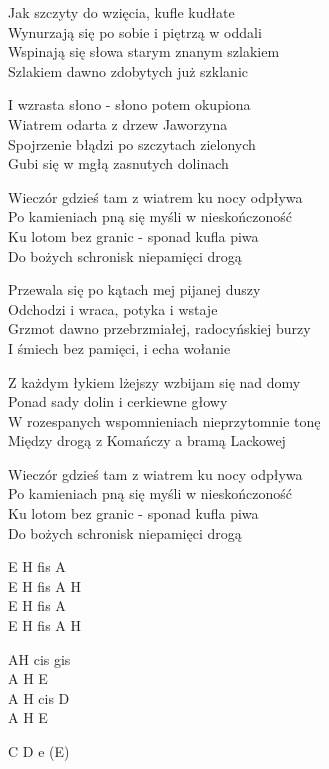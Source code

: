 \begin{text}
Jak szczyty do wzięcia, kufle kudłate\\
Wynurzają się po sobie i piętrzą w oddali\\
Wspinają się słowa starym znanym szlakiem\\
Szlakiem dawno zdobytych już szklanic

I wzrasta słono - słono potem okupiona\\
Wiatrem odarta z drzew Jaworzyna\\
Spojrzenie błądzi po szczytach zielonych\\
Gubi się w mgłą zasnutych dolinach

\vin Wieczór gdzieś tam z wiatrem ku nocy odpływa\\
\vin Po kamieniach pną się myśli w nieskończoność\\
\vin Ku lotom bez granic - sponad kufla piwa\\
\vin Do bożych schronisk niepamięci drogą

Przewala się po kątach mej pijanej duszy\\
Odchodzi i wraca, potyka i wstaje\\
Grzmot dawno przebrzmiałej, radocyńskiej burzy\\
I śmiech bez pamięci, i echa wołanie

Z każdym łykiem lżejszy wzbijam się nad domy\\
Ponad sady dolin i cerkiewne głowy\\
W rozespanych wspomnieniach nieprzytomnie tonę\\
Między drogą z Komańczy a bramą Lackowej

\vin Wieczór gdzieś tam z wiatrem ku nocy odpływa\\
\vin Po kamieniach pną się myśli w nieskończoność\\
\vin Ku lotom bez granic - sponad kufla piwa\\
\vin Do bożych schronisk niepamięci drogą
\end{text}
\begin{chord}
    E H fis A\\
    E H fis A H\\
    E H fis A\\
    E H fis A H

    \hfill\break
    \hfill\break
    \hfill\break

    AH cis gis\\
    A H E\\
    A H cis D\\
    A H E

    \hfill\break
    \hfill\break
    \hfill\break
    \hfill\break

    \hfill\break
    \hfill\break
    \hfill\break
    \hfill\break

    \hfill\break
    C D e (E)
\end{chord}